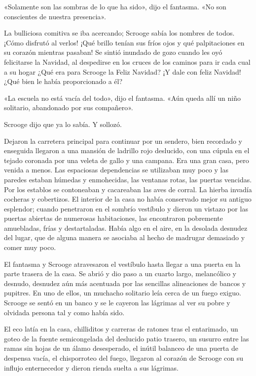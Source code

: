 \documentclass{novela}
\begin{document}
 «Solamente son las sombras de lo que ha sido», dijo el fantasma. «No son conscientes de nuestra presencia».

 La bulliciosa comitiva se iba acercando; Scrooge sabía los nombres de todos. ¡Cómo disfrutó al verlos! ¡Qué brillo tenían sus fríos ojos y qué palpitaciones en su corazón mientras pasaban! Se sintió inundado de gozo cuando les oyó felicitarse la Navidad, al despedirse en los cruces de los caminos para ir cada cual a su hogar ¿Qué era para Scrooge la Feliz Navidad? ¡Y dale con feliz Navidad! ¿Qué bien le había proporcionado a él?

 «La escuela no está vacía del todo», dijo el fantasma. «Aún queda allí un niño solitario, abandonado por sus compañero».

 Scrooge dijo que ya lo sabía. Y sollozó.

 Dejaron la carretera principal para continuar por un sendero, bien recordado y enseguida llegaron a una mansión de ladrillo rojo deslucido, con una cúpula en el tejado coronada por una veleta de gallo y una campana. Era una gran casa, pero venida a menos. Las espaciosas dependencias se utilizaban muy poco y las paredes estaban húmedas y enmohecidas, las ventanas rotas, las puertas vencidas. Por los establos se contoneaban y cacareaban las aves de corral. La hierba invadía cocheras y cobertizos. El interior de la casa no había conservado mejor su antiguo esplendor; cuando penetraron en el sombrío vestíbulo y dieron un vistazo por las puertas abiertas de numerosas habitaciones, las encontraron pobremente amuebladas, frías y destartaladas. Había algo en el aire, en la desolada desnudez del lugar, que de alguna manera se asociaba al hecho de madrugar demasiado y comer muy poco.

 El fantasma y Scrooge atravesaron el vestíbulo hasta llegar a una puerta en la parte trasera de la casa. Se abrió y dio paso a un cuarto largo, melancólico y desnudo, desnudez aún más acentuada por las sencillas alineaciones de bancos y pupitres. En uno de ellos, un muchacho solitario leía cerca de un fuego exiguo. Scrooge se sentó en un banco y se le cayeron las lágrimas al ver su pobre y olvidada persona tal y como había sido.

 El eco latía en la casa, chilliditos y carreras de ratones tras el entarimado, un goteo de la fuente semicongelada del deslucido patio trasero, un susurro entre las ramas sin hojas de un álamo desesperado, el inútil balanceo de una puerta de despensa vacía, el chisporroteo del fuego, llegaron al corazón de Scrooge con su influjo enternecedor y dieron rienda suelta a sus lágrimas.
\end{document}
